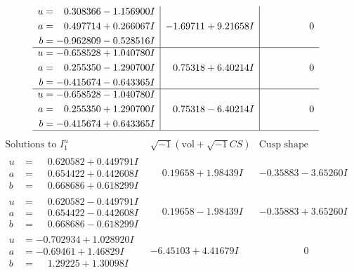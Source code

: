 \documentclass[1p]{elsarticle_modified}
\theoremstyle{definition}
\newcommand{\I}{\sqrt{-1}}
\begin{document}
$$\begin{array}{c|c|c}
\begin{aligned}
u &= \phantom{-}0.308366 - 1.156900 I \\
a &= \phantom{-}0.497714 + 0.266067 I \\
b &= -0.962809 - 0.528516 I\end{aligned}
 & -1.69711 + 9.21658 I & \phantom{-0.000000 } 0 \\ \hline\begin{aligned}
u &= -0.658528 + 1.040780 I \\
a &= \phantom{-}0.255350 - 1.290700 I \\
b &= -0.415674 - 0.643365 I\end{aligned}
 & \phantom{-}0.75318 + 6.40214 I & \phantom{-0.000000 } 0 \\ \hline\begin{aligned}
u &= -0.658528 - 1.040780 I \\
a &= \phantom{-}0.255350 + 1.290700 I \\
b &= -0.415674 + 0.643365 I\end{aligned}
 & \phantom{-}0.75318 - 6.40214 I & \phantom{-0.000000 } 0\\
 \hline 
 \end{array}$$\newpage$$\begin{array}{c|c|c}  
\text{Solutions to }I^u_{1}& \I (\text{vol} + \sqrt{-1}CS) & \text{Cusp shape}\\
 \hline 
\begin{aligned}
u &= \phantom{-}0.620582 + 0.449791 I \\
a &= \phantom{-}0.654422 + 0.442608 I \\
b &= \phantom{-}0.668686 + 0.618299 I\end{aligned}
 & \phantom{-}0.19658 + 1.98439 I & -0.35883 - 3.65260 I \\ \hline\begin{aligned}
u &= \phantom{-}0.620582 - 0.449791 I \\
a &= \phantom{-}0.654422 - 0.442608 I \\
b &= \phantom{-}0.668686 - 0.618299 I\end{aligned}
 & \phantom{-}0.19658 - 1.98439 I & -0.35883 + 3.65260 I \\ \hline\begin{aligned}
u &= -0.702934 + 1.028920 I \\
a &= -0.69461 + 1.46829 I \\
b &= \phantom{-}1.29225 + 1.30098 I\end{aligned}
 & -6.45103 + 4.41679 I & \phantom{-0.000000 } 0 \\ \hline\begin{aligned}

\end{aligned}
\end{array}$$
\end{document}
